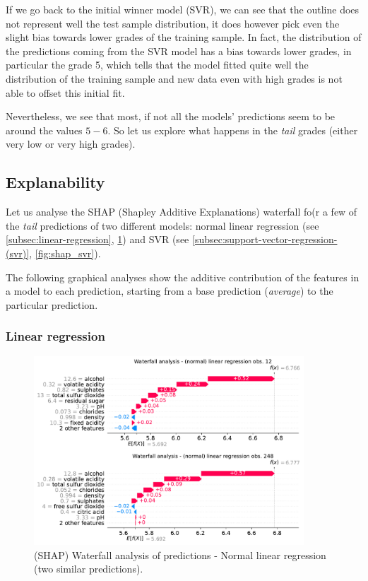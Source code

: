 \documentclass[11pt]{article}
\begin{document}
If we go back to the initial winner model (SVR), we can see that the outline does not represent well the test sample
distribution, it does however pick even the slight bias towards lower grades of the training sample.
In fact, the distribution of the predictions coming from the SVR model has a bias towards lower grades, in particular
the grade 5, which tells that the model fitted quite well the distribution of the training sample and new data even
with high grades is not able to offset this initial fit.

Nevertheless, we see that most, if not all the models' predictions seem to be around the values $5-6$.
So let us explore what happens in the \emph{tail} grades (either very low or very high grades).

\subsection{Explanability} \label{subsec:explanability}

Let us analyse the SHAP (Shapley Additive Explanations) waterfall fo(r a few of the \emph{tail} predictions of two
different models: normal linear regression (see \cref{subsec:linear-regression}, \cref{fig:shap_nlr}) and SVR
(see \cref{subsec:support-vector-regression-(svr)}, \cref{fig:shap_svr}).

The following graphical analyses show the additive contribution of the features in a model to each prediction, starting
from a base prediction (\emph{average}) to the particular prediction.

\subsubsection{Linear regression}\label{subsubsec:linear-regression}
\begin{figure}[h!]
    \centering
    \includegraphics[width=0.9\textwidth]{figs/shape_nlr}
    \caption{(SHAP) Waterfall analysis of predictions - Normal linear regression (two similar predictions).}
    \label{fig:shap_nlr}
\end{figure}
\end{document}
